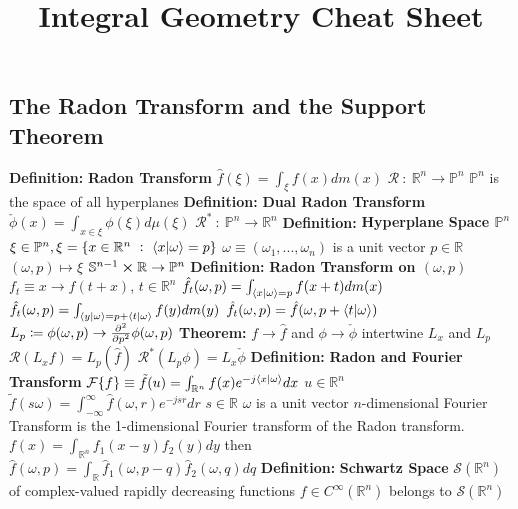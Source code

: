 \documentclass[14pt]{extarticle}
\title{Integral Geometry Cheat Sheet}
\def\Definition{{\color{blue} \textbf{Definition:} }}
\def\Theorem{{\color{red} \textbf{Theorem:} }}
\begin{document}
	\maketitle	
	\begin{outline}		
		\section*{The Radon Transform and the Support Theorem}
		\1	\Definition \textbf{Radon Transform}
			\2	$\hat{f}(\xi) = \int_{\xi}f(x) dm(x)$
				\3	$\mathcal{R}~:~\mathbb{R}^n \rightarrow \mathbb{P}^n$
					\4	$\mathbb{P}^n$ is the space of all hyperplanes 
		\1	\Definition \textbf{Dual Radon Transform}
			\2	$\check{\phi}(x) = \int_{x \in \xi} \phi(\xi)d\mu(\xi)$
				\3	$\mathcal{R}^*~:~\mathbb{P}^n \rightarrow \mathbb{R}^n$
		\1	\Definition \textbf{Hyperplane Space $\mathbb{P}^n$}
			\2	$\xi \in \mathbb{P}^n, \xi = \{x \in \mathbb{R}^n~:~\braket{x}{\omega} = p\}$
				\3	$\omega \equiv (\omega_1,...,\omega_n)$ is a unit vector
				\3	$p \in \mathbb{R}$
			\2	$(\omega,p) \mapsto \xi$
			\2	$\mathbb{S}^{n-1} \cross \mathbb{R} \rightarrow \mathbb{P}^n$
		\1	\Definition \textbf{Radon Transform on $(\omega,p)$}
			\2	$f_t \equiv x \rightarrow f(t + x)$, $t \in \mathbb{R}^n$ 
			\2	$\hat{f}_t(\omega,p) = \int_{\braket{x}{\omega} = p}f(x + t)dm(x)$
			\2	$\hat{f}_t(\omega,p) = \int_{\braket{y}{\omega} = p + \braket{t}{\omega}}f(y)dm(y)$
			\2	$\hat{f}_t(\omega,p) = \hat{f}(\omega,p + \braket{t}{\omega})$
			\2	$L_p \coloneqq \phi(\omega,p) \rightarrow \pd[2]{}{p} \phi(\omega,p)$
		\1	\Theorem $f \rightarrow \hat{f}$ and $\phi \rightarrow \check{\phi}$ 
				intertwine $L_x$ and $L_p$
			\2	$\mathcal{R}(L_xf) = L_p(\hat{f})$
			\2	$\mathcal{R}^*(L_p \phi) = L_x \check{\phi}$
		\1	\Definition \textbf{Radon and Fourier Transform}
			\2	$\mathcal{F}\{f\} \equiv \tilde{f}(u) = \int_{\mathbb{R}^n} f(x) e^{-j \braket{x}{\omega}} dx$
				\3	$u \in \mathbb{R}^n$
			\2	$\tilde{f}(s\omega) = \int_{-\infty}^{\infty} \hat{f}(\omega,r)e^{-jsr}dr$
				\3	$s \in \mathbb{R}$
				\3	$\omega$ is a unit vector
			\2	$n$-dimensional Fourier Transform is the 1-dimensional Fourier transform
					of the Radon transform.
			\2	$f(x) = \int_{\mathbb{R}^n} f_1(x-y)f_2(y) dy$ then~\\
					$\hat{f}(\omega,p) = \int_{\mathbb{R}}\hat{f}_1(\omega,p-q)\hat{f}_2(\omega,q)dq$
		\1	\Definition \textbf{Schwartz Space}
			\2	$\mathcal{S}(\mathbb{R}^n)$ of complex-valued rapidly decreasing functions
				\3	$f \in C^{\infty}(\mathbb{R}^n)$ belongs to $\mathcal{S}(\mathbb{R}^n)$

\end{outline}
\end{document}

